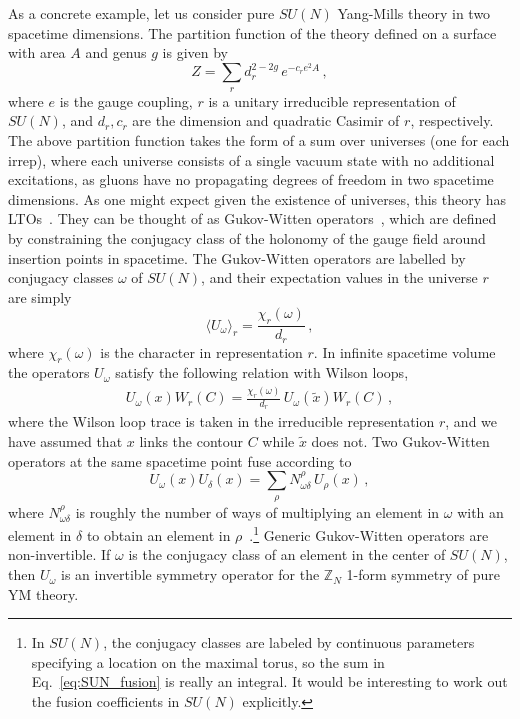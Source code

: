 \documentclass[11pt]{article}
\def\ZZ{\mathbb{Z}}
\begin{document}
As a concrete example, let us consider pure $SU(N)$ Yang-Mills theory in two spacetime dimensions. The partition function of the theory defined on a surface with area $A$ and genus $g$ is given by~\cite{Migdal:1975zg,Witten:1991we}
\begin{equation}
Z = \sum_{r} d_{r}^{2-2g}\, e^{-c_{r} e^{2} A}\,,
\label{eq:SU(N)_partition_fn}
\end{equation}
where $e$ is the gauge coupling, $r$ is a unitary irreducible representation of $SU(N)$, and $d_r,c_{r}$ are the dimension and quadratic Casimir of $r$, respectively. The above partition function takes the form of a sum over universes (one for each irrep), where each universe consists of a single vacuum state with no additional excitations, as gluons have no propagating degrees of freedom in two spacetime dimensions. As one might expect given the existence of universes, this theory has LTOs~\cite{Nguyen:2021naa}. They can be thought of as Gukov-Witten operators~\cite{Alford:1992yx,Kapustin:2005py,Gukov:2008sn}, which are defined by constraining the conjugacy class of the holonomy of the gauge field around insertion points in spacetime. The Gukov-Witten operators are labelled by conjugacy classes $\omega$ of $SU(N)$, and their expectation values in the universe $r$ are simply
\begin{equation}
    \langle U_\omega \rangle_{r} = \frac{\chi_{r}(\omega)}{d_{r}}\,,
\end{equation}
where  $\chi_r(\omega)$ is the character in  representation $r$. In infinite spacetime volume the operators $U_{\omega}$ satisfy the following relation with Wilson loops, 
\begin{align}
U_\omega(x)W_r(C) = \frac{\chi_{r}(\omega)}{d_{r}}\, U_{\omega}(\tilde{x}) W_{r}(C)\,, 
\label{eq:SU(N)_action_Wloops}
\end{align}
where the Wilson loop trace is taken in the irreducible representation $r$, and we have assumed that $x$ links the contour $C$ while $\tilde x$ does not. Two Gukov-Witten operators at the same spacetime point fuse according to 
\begin{equation}
U_{\omega}(x)U_{\delta}(x) = \sum_{\rho} N^\rho_{\omega\delta}\, U_\rho(x)\,, 
\label{eq:SUN_fusion}
\end{equation}
where $N^\rho_{\omega\delta}$ is roughly the number of ways of multiplying an element in $\omega$ with an element in $\delta$ to obtain an element in $\rho$~\cite{Heidenreich:2021tna}.\footnote{In $SU(N)$, the conjugacy classes are labeled by continuous parameters specifying a location on the maximal torus, so the sum in Eq.~\eqref{eq:SUN_fusion} is really an integral.  It would be interesting to work out the fusion coefficients in $SU(N)$ explicitly.} Generic Gukov-Witten operators are non-invertible. If $\omega$ is the conjugacy class of an element in the  center of $SU(N)$, then $U_\omega$ is an invertible symmetry operator for the $\ZZ_N$ 1-form symmetry of pure YM theory.
\end{document}
